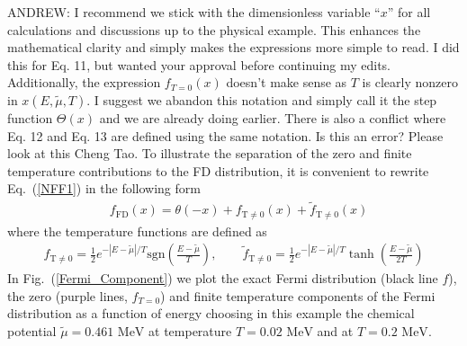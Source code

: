 \documentclass[sn-mathphys,Numbered]{sn-jnl}
\newcommand*{\MeV}{\text{ MeV}}
\newcommand*{\xmagenta}{\color{magenta}}
\begin{document}
{\xmagenta ANDREW: I recommend we stick with the dimensionless variable ``$x$'' for all calculations and discussions up to the physical example. This enhances the mathematical clarity and simply makes the expressions more simple to read. I did this for Eq. 11, but wanted your approval before continuing my edits. Additionally, the expression $f_{T=0}(x)$ doesn't make sense as $T$ is clearly nonzero in $x(E,\widetilde\mu,T)$. I suggest we abandon this notation and simply call it the step function $\Theta(x)$ and we are already doing earlier. There is also a conflict where Eq. 12 and Eq. 13 are defined using the same notation. Is this an error? Please look at this Cheng Tao.} To illustrate the separation of the zero and finite temperature contributions to the FD distribution, it is convenient to rewrite Eq.~(\ref{NFF1}) in the following form
\begin{align}\label{Eq_form}
&f_\mathrm{FD}(x)=\theta(-x)+f_\mathrm{T\neq0}(x)+\tilde f_\mathrm{T\neq0}(x)
\end{align}
where the temperature functions are defined as
\begin{align}
f_\mathrm{T\neq0}=\frac{1}{2}e^{ - |E-\widetilde\mu|/T }\mathrm{sgn}\left(\frac{E-\widetilde\mu}{T}\right),\qquad
\tilde f_\mathrm{T\neq0}=\frac{1}{2}e^{ - |E-\widetilde\mu|/T }\tanh\left(\frac{E-\widetilde\mu}{2T}\right)
\end{align}
In Fig.~(\ref{Fermi_Component}) we plot the exact Fermi distribution (black line $f$), the zero (purple lines, $f_{T=0}$) and finite temperature components of the Fermi distribution as a function of energy choosing in this example the chemical potential $\widetilde\mu=0.461\MeV$ at temperature $T=0.02\MeV$ and at $T=0.2\MeV$.
\end{document}
